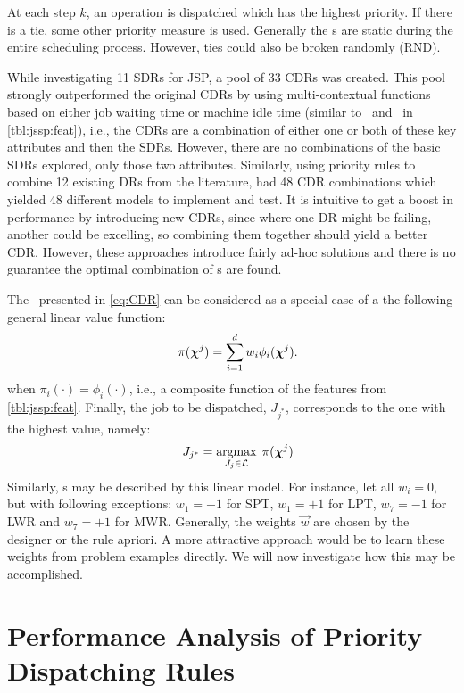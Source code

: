\documentclass[twocolumn]{svjour3}
\begin{document}
At each step $k$, an operation is dispatched which has the highest 
priority.  If there is a tie, some other priority measure is used. Generally 
the \dr s are static during the entire scheduling process. However, ties could 
also be broken randomly (RND). 

While investigating 11 SDRs for JSP, \cite{Lu13} a pool of 33 CDRs was created. 
This pool strongly outperformed the original CDRs by using multi-contextual 
functions based on either job waiting time or machine idle time (similar 
to \phiwait\ and \phimacSlack\ in \cref{tbl:jssp:feat}), i.e., the CDRs are a 
combination of either one or both of these key attributes and then the SDRs.
However, there are no combinations of the basic SDRs explored, only those two 
attributes.  
Similarly, using priority rules to combine 12 existing DRs from the literature, 
\cite{Yu13} had 48 CDR combinations which yielded 48 different models 
to implement and test. 
It is intuitive to get a boost in performance by introducing new CDRs, since 
where one DR might be failing, another could be excelling, so combining them 
together should yield a better CDR. However, these approaches introduce fairly 
ad-hoc solutions and there is no guarantee the optimal combination of 
\dr s are found.

The \cdr\ presented in \cref{eq:CDR} can be considered as a special case of a 
the following general linear value function:
\begin{equation}\quad\label{eq:jssp:linweights}
\pi(\bm \chi^j)=\sum_{i=1}^d w_i \phi_i(\bm \chi^j).
\end{equation}
when $\pi_i(\cdot)=\phi_i(\cdot)$, i.e., a composite function of the features 
from \cref{tbl:jssp:feat}. Finally, the job to be dispatched, $J_{j^*}$, 
corresponds to the one with the highest value, namely:
\begin{equation}\quad\label{eq:jstar}
J_{j^*}=\mathop{\rm argmax}_{J_j\in \mathcal{L}}\; \pi(\bm \chi^j)
\end{equation}
Similarly, \sdr s may be described by this linear model. For instance, let all 
$w_i=0$, but with following exceptions: $w_1=-1$ for SPT, $w_1=+1$ for LPT, 
$w_7=-1$ for LWR and $w_7=+1$ for MWR. Generally, the weights $\vec{w}$ are 
chosen by the designer or the 
rule apriori.  A more attractive approach would be to learn these weights from 
problem examples directly. We will now investigate how this may be accomplished.

\section{Performance Analysis of Priority Dispatching Rules}\label{sec:learnOPT}
\end{document}
